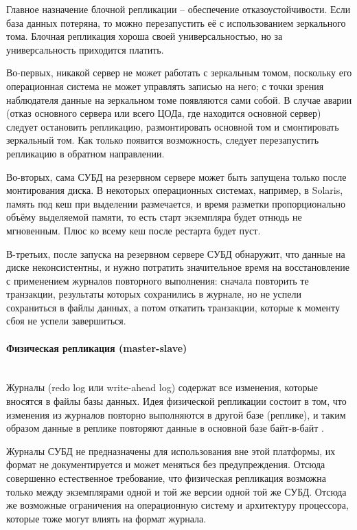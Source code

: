 Главное назначение блочной репликации – обеспечение отказоустойчивости. Если база данных потеряна, то можно
перезапустить её с использованием зеркального тома. Блочная репликация хороша своей универсальностью, но за
универсальность приходится платить.

Во-первых, никакой сервер не может работать с зеркальным томом, поскольку его операционная система не может управлять
записью на него; с точки зрения наблюдателя данные на зеркальном томе появляются сами собой. В случае аварии (отказ
основного сервера или всего ЦОДа, где находится основной сервер) следует остановить репликацию, размонтировать основной
том и смонтировать зеркальный том. Как только появится возможность, следует перезапустить репликацию в обратном
направлении.

Во-вторых, сама СУБД на резервном сервере может быть запущена только после монтирования диска. В некоторых операционных
системах, например, в Solaris, память под кеш при выделении размечается, и время разметки пропорционально объёму
выделяемой памяти, то есть старт экземпляра будет отнюдь не мгновенным. Плюс ко всему кеш после рестарта будет пуст.

В-третьих, после запуска на резервном сервере СУБД обнаружит, что данные на диске неконсистентны, и нужно потратить
значительное время на восстановление с применением журналов повторного выполнения: сначала повторить те транзакции,
результаты которых сохранились в журнале, но не успели сохраниться в файлы данных, а потом откатить транзакции, которые
к моменту сбоя не успели завершиться. \autocite{Replication}

\paragraph{Физическая репликация (master-slave)} ~\\
Журналы (redo log или write-ahead log) содержат все изменения, которые вносятся в файлы базы данных. Идея физической
репликации состоит в том, что изменения из журналов повторно выполняются в другой базе (реплике), и таким образом данные
в реплике повторяют данные в основной базе байт-в-байт \autocite{PhysLogPeplic}.

Журналы СУБД не предназначены для использования вне этой платформы, их формат не документируется и может меняться без
предупреждения. Отсюда совершенно естественное требование, что физическая репликация возможна только между экземплярами
одной и той же версии одной той же СУБД. Отсюда же возможные ограничения на операционную систему и архитектуру
процессора, которые тоже могут влиять на формат журнала.

